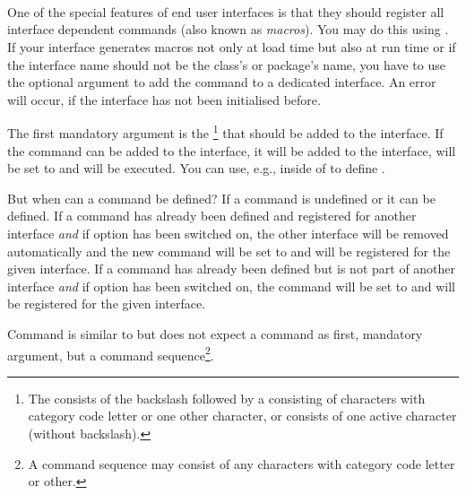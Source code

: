 \begin{Declaration}
  \\
  \\
  \\
\end{Declaration}
%
%
%
%
One of the special features of end user interfaces is that they should
register all interface dependent commands (also known as \emph{macros}). You
may do this using %
. If your interface generates macros not only at load time but also at run
time or if the interface name should not be the class's or package's name, you
have to use the optional argument to add the command to a dedicated
interface. An error will occur, if the interface has not been initialised
before.

The first mandatory argument is the \footnote{The
   consists of the backslash followed by a  consisting of characters with category code letter or one other
  character, or  consists of one active character (without
  backslash).} that should be added to the interface. If the command can be
added to the interface, it will be added to the interface, will be set to
 and  will be executed. You can use, e.g.,
 inside of  to define
.

But when can a command be defined? If a command is undefined or 
it can be defined. If a command has already been defined and registered for
another interface \emph{and} if \KOMAScript{} option
 has been switched on, the other interface will be
removed automatically and the new command will be set to  and
will be registered for the given interface. If a command
has already been defined but is not part of another interface \emph{and} if
\KOMAScript{} option  has been switched on, the command
will be set to  and will be registered for the given interface.

Command  is similar to
 but does not expect a command as first,
mandatory argument, but a command sequence\footnote{A command sequence may
  consist of any characters with category code letter or other.}.%
%
%
%

